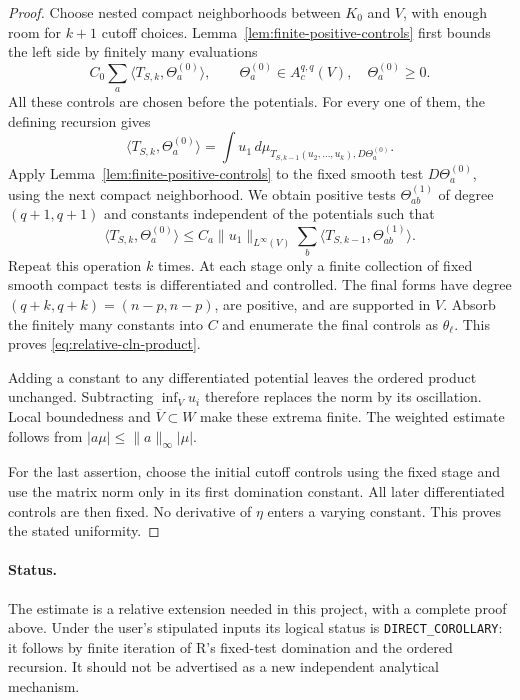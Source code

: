 \documentclass[11pt,a4paper]{article}
\numberwithin{equation}{section}
\theoremstyle{definition}
\theoremstyle{remark}
\begin{document}
\begin{proof}
Choose nested compact neighborhoods between $K_0$ and $V$, with enough
room for $k+1$ cutoff choices. Lemma~\ref{lem:finite-positive-controls}
first bounds the left side by finitely many evaluations
\[
 C_0\sum_a\langle T_{S,k},\Theta_a^{(0)}\rangle,
 \qquad \Theta_a^{(0)}\in A_c^{q,q}(V),\quad
 \Theta_a^{(0)}\geq0.
\]
All these controls are chosen before the potentials. For every one of
them, the defining recursion gives
\[
 \langle T_{S,k},\Theta_a^{(0)}\rangle
 =\int u_1\,d\mu_{T_{S,k-1}(u_2,\ldots,u_k),D\Theta_a^{(0)}}.
\]
Apply Lemma~\ref{lem:finite-positive-controls} to the fixed smooth test
$D\Theta_a^{(0)}$, using the next compact neighborhood. We obtain
positive tests $\Theta_{ab}^{(1)}$ of degree $(q+1,q+1)$ and constants
independent of the potentials such that
\[
 \langle T_{S,k},\Theta_a^{(0)}\rangle
 \leq C_a\|u_1\|_{L^\infty(V)}
       \sum_b\langle T_{S,k-1},\Theta_{ab}^{(1)}\rangle.
\]
Repeat this operation $k$ times. At each stage only a finite collection
of fixed smooth compact tests is differentiated and controlled.
The final forms have degree $(q+k,q+k)=(n-p,n-p)$, are positive,
and are supported in $V$. Absorb the finitely many constants into $C$
and enumerate the final controls as $\theta_\ell$. This proves
\eqref{eq:relative-cln-product}.

Adding a constant to any differentiated potential leaves the ordered
product unchanged. Subtracting $\inf_Vu_i$ therefore replaces the norm
by its oscillation. Local boundedness and $\overline V\subset W$
make these extrema finite. The weighted estimate follows from
$|a\mu|\leq\|a\|_\infty|\mu|$.

For the last assertion, choose the initial cutoff controls using the
fixed stage and use the matrix norm only in its first domination
constant. All later differentiated controls are then fixed. No
derivative of $\eta$ enters a varying constant. This proves the stated
uniformity.
\end{proof}

\paragraph{Status.}
The estimate is a relative extension needed in this project, with a
complete proof above. Under the user's stipulated inputs its logical
status is \texttt{DIRECT\_COROLLARY}: it follows by finite iteration of
R's fixed-test domination and the ordered recursion. It should not be
advertised as a new independent analytical mechanism.
\end{document}
